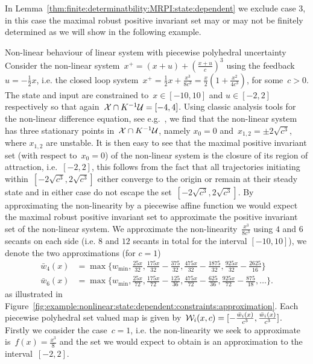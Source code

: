 %
\noindent In Lemma~\ref{thm:finite:determinatbility:MRPI:state:dependent} we exclude case 3, in this case the maximal robust positive invariant set may or may not be finitely determined as we will show in the following example.
%
\begin{example}{Non-linear behaviour of linear system with piecewise polyhedral uncertainty}\label{example:non:contracting:example:of:MRPI}
Consider the non-linear system~$x^+ = (x+u)+\left(\frac{x+u}{c}\right)^3$ using the feedback $u=-\frac{1}{2}x$, i.e. the closed loop system~$x^+ = \frac{1}{2}x+\frac{x^3}{8c^3} = \frac{x}{2}\left(1+\frac{x^2}{4c^3}\right)$, for some~$c>0$.
%
The state and input are constrained to~$x\in[-10,10]$ and $u\in[-2,2]$ respectively so that again~$\mathcal X\cap K^{-1}\mathcal U=[-4,4]$.
%
Using classic analysis tools for the non-linear difference equation, see e.g.~\cite{Devaney:2003}, we find that the non-linear system has three stationary points in~$\mathcal X\cap K^{-1}\mathcal U$, namely $x_0=0$ and~$x_{1,2}=\pm2\sqrt{c^3}$, where $x_{1,2}$ are unstable.
%
It is then easy to see that the maximal positive invariant set (with respect to~$x_0=0$) of the non-linear system is the closure of its region of attraction, i.e.~$[-2,2]$, this follows from the fact that all trajectories initiating within~$[-2\sqrt{c^3},2\sqrt{c^3}]$ either converge to the origin or remain at their steady state and in either case do not escape the set~$[-2\sqrt{c^3},2\sqrt{c^3}]$.
%
By approximating the non-linearity by a piecewise affine function we would expect the maximal robust positive invariant set to approximate the positive invariant set of the non-linear system.
%
We approximate the non-linearity~$\frac{x^3}{8c^3}$ using $4$ and $6$ secants on each side (i.e. $8$ and $12$ secants in total for the interval $[-10,10]$), we denote the two approximations (for $c=1$)
%
\[\begin{aligned}
	\bar w_4(x) &= \max\{w_{\min},\frac{25 x}{32},\frac{175 x}{32}-\frac{375}{32},\frac{475 x}{32}-\frac{1875}{32},\frac{925 x}{32}-\frac{2625}{16}\}\\
	\bar w_6(x) &= \max\{w_{\min},\frac{25 x}{72},\frac{175 x}{72}-\frac{125}{36},\frac{475 x}{72}-\frac{625}{36},\frac{925 x}{72}-\frac{875}{18},\dots\}.
\end{aligned}\]
%
as illustrated in Figure~\ref{fig:example:nonlinear:state:dependent:constraints:approximation}.
%
Each piecewise polyhedral set valued map is given by~$\mathcal W_i(x,c)=[-\frac{\bar w_i(x)}{c^3},\frac{\bar w_i(x)}{c^3}]$.
%
\\[1em]
%
Firstly we consider the case~$c=1$, i.e. the non-linearity we seek to approximate is~$f(x)=\frac{x^3}{8}$ and the set we would expect to obtain is an approximation to the interval~$[-2,2]$.

\end{example}
